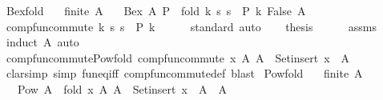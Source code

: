 \begin{isabellebody}
\isamarkupfalse%
\ Bex{\isacharunderscore}{\kern0pt}fold{\isacharcolon}{\kern0pt}\isanewline
\ \ \ {\isachardoublequoteopen}finite\ A{\isachardoublequoteclose}\isanewline
\ \ \ {\isachardoublequoteopen}Bex\ A\ P\ {\isacharequal}{\kern0pt}\ fold\ {\isacharparenleft}{\kern0pt}{\isasymlambda}k\ s{\isachardot}{\kern0pt}\ s\ {\isasymor}\ P\ k{\isacharparenright}{\kern0pt}\ False\ A{\isachardoublequoteclose}\isanewline
%
\isadelimproof
%
\endisadelimproof
%
\isatagproof
{}\isamarkupfalse%
\ {\isacharminus}{\kern0pt}\isanewline
\ \ \isamarkupfalse%
\ comp{\isacharunderscore}{\kern0pt}fun{\isacharunderscore}{\kern0pt}commute\ {\isachardoublequoteopen}{\isasymlambda}k\ s{\isachardot}{\kern0pt}\ s\ {\isasymor}\ P\ k{\isachardoublequoteclose}\isanewline
\ \ \ \ \isamarkupfalse%
\ standard\ auto\isanewline
\ \ \isamarkupfalse%
\ {\isacharquery}{\kern0pt}thesis\isanewline
\ \ \ \ \isamarkupfalse%
\ assms\ \isamarkupfalse%
\ {\isacharparenleft}{\kern0pt}induct\ A{\isacharparenright}{\kern0pt}\ auto\isanewline
{}\isamarkupfalse%
%
\endisatagproof
{\isafoldproof}%
%
\isadelimproof
\isanewline
%
\endisadelimproof
\isanewline
{}\isamarkupfalse%
\ comp{\isacharunderscore}{\kern0pt}fun{\isacharunderscore}{\kern0pt}commute{\isacharunderscore}{\kern0pt}Pow{\isacharunderscore}{\kern0pt}fold{\isacharcolon}{\kern0pt}\ {\isachardoublequoteopen}comp{\isacharunderscore}{\kern0pt}fun{\isacharunderscore}{\kern0pt}commute\ {\isacharparenleft}{\kern0pt}{\isasymlambda}x\ A{\isachardot}{\kern0pt}\ A\ {\isasymunion}\ Set{\isachardot}{\kern0pt}insert\ x\ {\isacharbackquote}{\kern0pt}\ A{\isacharparenright}{\kern0pt}{\isachardoublequoteclose}\isanewline
%
\isadelimproof
\ \ %
\endisadelimproof
%
\isatagproof
{}\isamarkupfalse%
\ {\isacharparenleft}{\kern0pt}clarsimp\ simp{\isacharcolon}{\kern0pt}\ fun{\isacharunderscore}{\kern0pt}eq{\isacharunderscore}{\kern0pt}iff\ comp{\isacharunderscore}{\kern0pt}fun{\isacharunderscore}{\kern0pt}commute{\isacharunderscore}{\kern0pt}def{\isacharparenright}{\kern0pt}\ blast%
\endisatagproof
{\isafoldproof}%
%
\isadelimproof
\isanewline
%
\endisadelimproof
\isanewline
{}\isamarkupfalse%
\ Pow{\isacharunderscore}{\kern0pt}fold{\isacharcolon}{\kern0pt}\isanewline
\ \ \ {\isachardoublequoteopen}finite\ A{\isachardoublequoteclose}\isanewline
\ \ \ {\isachardoublequoteopen}Pow\ A\ {\isacharequal}{\kern0pt}\ fold\ {\isacharparenleft}{\kern0pt}{\isasymlambda}x\ A{\isachardot}{\kern0pt}\ A\ {\isasymunion}\ Set{\isachardot}{\kern0pt}insert\ x\ {\isacharbackquote}{\kern0pt}\ A{\isacharparenright}{\kern0pt}\ {\isacharbraceleft}{\kern0pt}{\isacharbraceleft}{\kern0pt}{\isacharbraceright}{\kern0pt}{\isacharbraceright}{\kern0pt}\ A{\isachardoublequoteclose}\isanewline

\end{isabellebody}
